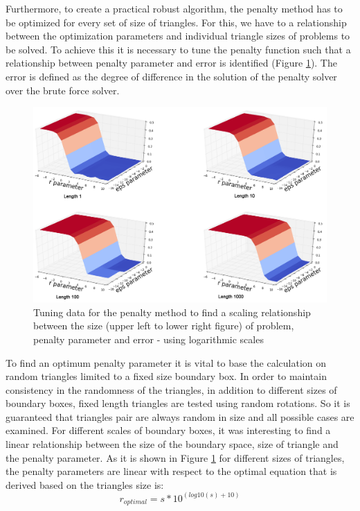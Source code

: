 \documentclass[times,12pt]{ACME2015article}
\begin{document}
Furthermore, to create a practical robust algorithm, the penalty method has to be optimized for every set of size of triangles. For this, we have to a relationship between the optimization parameters and individual triangle sizes of problems to be solved. To achieve this it is necessary to tune the penalty function such that a relationship between penalty parameter and error is identified (Figure \ref{fig14}). The error is defined as the degree of difference in the solution of the penalty solver over the brute force solver.
\clearpage

\begin{figure}[!h]
\centerline{\includegraphics[width=1\textwidth]{figure_1.png}} \protect\caption{\label{fig14}Tuning data for the penalty method to find a scaling relationship between the size (upper left to lower right figure) of problem, penalty parameter and error - using logarithmic scales}
\end{figure} 

To find an optimum penalty parameter it is vital to base the calculation on random triangles limited to a fixed size boundary box. In order to maintain consistency in the randomness of the triangles, in addition to different sizes of boundary boxes, fixed length triangles are tested using random rotations. So it is guaranteed that triangles pair are always random in size and all possible cases are examined. For different scales of boundary boxes, it was interesting to find a linear relationship between the size of the boundary space, size of triangle and the penalty parameter. As it is shown in Figure \ref{fig14} for different sizes of triangles, the penalty parameters are linear with respect to the optimal equation that is derived based on the triangles size is: 
\begin{equation}
r_{optimal} = s*10^{(log10(s)+10)} 
\end{equation}
\end{document}
